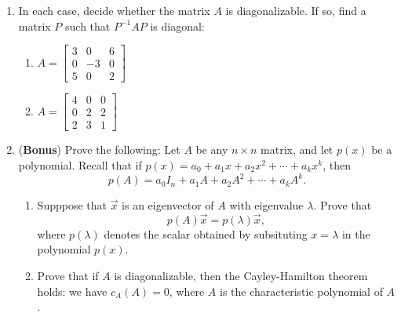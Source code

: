 \documentclass[letterpaper,12pt]{article}
\begin{document}
\begin{enumerate}
\begin{enumerate}
\end{enumerate}
\newpage
\item In each case, decide whether the matrix $A$ is diagonalizable. If so, find a matrix $P$ such that $P^{-1}AP$ is diagonal:
\begin{enumerate}
 \item $A=\begin{bmatrix}
           3&0&6\\0&-3&0\\5&0&2
          \end{bmatrix}$
 \item $A=\begin{bmatrix}
           4&0&0\\0&2&2\\2&3&1
          \end{bmatrix}$


\end{enumerate}
\item ({\bf Bonus}) Prove the following: Let $A$ be any $n\times n$ matrix, and let $p(x)$ be a polynomial. Recall that if $p(x)=a_0+a_1x+a_2x^2+\cdots + a_kx^k$, then
\[
 p(A) = a_0I_n + a_1A + a_2A^2+\cdots + a_kA^k.
\]
\begin{enumerate}
 \item Supppose that $\vec{x}$ is an eigenvector of $A$ with eigenvalue $\lambda$. Prove that
\[
 p(A)\vec{x} = p(\lambda)\vec{x},
\]
where $p(\lambda)$ denotes the scalar obtained by subsituting $x=\lambda$ in the polynomial $p(x)$.
 \item Prove that if $A$ is diagonalizable, then the Cayley-Hamilton theorem holds: we have $c_A(A)=0$, where $A$ is the characteristic polynomial of $A$.
\end{enumerate}


\end{enumerate}
\end{document}
